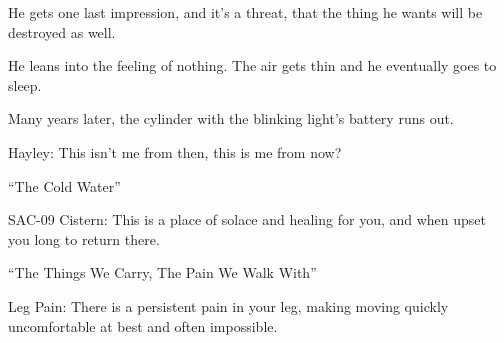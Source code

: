 He gets one last impression, and it's a threat, that the thing he wants will be destroyed as well. 



He leans into the feeling of nothing.  The air gets thin and he eventually goes to sleep. 



Many years later, the cylinder with the blinking light's battery runs out. 


{
  \parskip=3mm


Hayley: This isn't me from then, this is me from now?\\[4mm]











 ``The Cold Water''

 SAC-09 Cistern: This is a place of solace and healing for you, and when upset you long to return there.



 ``The Things We Carry, The Pain We Walk With''

 Leg Pain: There is a persistent pain in your leg, making moving quickly uncomfortable at best and often impossible.



}
